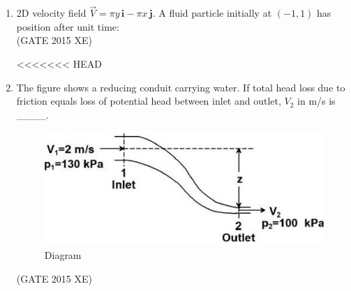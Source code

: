 \documentclass[journal,12pt,onecolumn]{IEEEtran}
\begin{document}
\begin{enumerate}
\begin{enumerate}
\begin{enumerate}[label=\arabic*)]
\begin{multicols}{4}
<<<<<<< HEAD
\end{multicols}

\item 2D velocity field $\vec{V} = \pi y \,\mathbf{i} - \pi x\,\mathbf{j}$. A fluid particle initially at $(-1,1)$ has position after unit time:\\

\hfill{(GATE 2015 XE)} 
\begin{multicols}{4}
<<<<<<< HEAD
\end{multicols}

\newpage

\item The figure shows a reducing conduit carrying water. If total head loss due to friction equals loss of potential head between inlet and outlet, $V_2$ in m/s is \_\_\_\_. \\

\begin{figure}[htbp]
  \centering
  \includegraphics[width=.68\columnwidth]{figs/B/fig4.png} 
  \caption{Diagram}
  \label{fig:figs/B/fig4.png}
\end{figure}
\hfill{(GATE 2015 XE)} \\


\end{enumerate}
\end{enumerate}
\end{enumerate}
\end{document}
